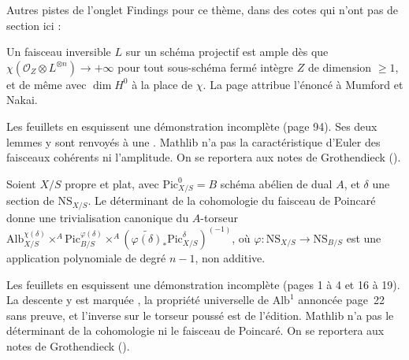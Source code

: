 \bigskip
\noindent Autres pistes de l'onglet Findings pour ce thème, dans des cotes qui n'ont pas de section ici :\par

\begin{encadre}
\begin{theoreme*}\nonverifie
Un faisceau inversible $L$ sur un schéma projectif est ample dès que $\chi(\mathcal O_Z \otimes L^{\otimes n}) \to +\infty$ pour tout sous-schéma fermé intègre $Z$ de dimension $\geq 1$, et de même avec $\dim H^0$ à la place de $\chi$. La page attribue l'énoncé à Mumford et Nakai.
\end{theoreme*}
\end{encadre}
{\small Les feuillets en esquissent une démonstration incomplète (page 94). Ses deux lemmes y sont renvoyés à une . Mathlib n'a pas la caractéristique d'Euler des faisceaux cohérents ni l'amplitude. On se reportera aux notes de Grothendieck ().\par}

\begin{encadre}
\begin{theoreme*}\nonverifie
Soient $X/S$ propre et plat, avec $\mathrm{Pic}^0_{X/S} = B$ schéma abélien de dual $A$, et $\delta$ une section de $\mathrm{NS}_{X/S}$. Le déterminant de la cohomologie du faisceau de Poincaré donne une trivialisation canonique du $A$-torseur $\mathrm{Alb}^{\chi(\delta)}_{X/S} \times^A \mathrm{Pic}^{\varphi(\delta)}_{B/S} \times^A (\widetilde{\varphi(\delta)}_*\mathrm{Pic}^\delta_{X/S})^{(-1)}$, où $\varphi : \mathrm{NS}_{X/S} \to \mathrm{NS}_{B/S}$ est une application polynomiale de degré $n - 1$, non additive.
\end{theoreme*}
\end{encadre}
{\small Les feuillets en esquissent une démonstration incomplète (pages 1 à 4 et 16 à 19). La descente y est marquée , la propriété universelle de $\mathrm{Alb}^1$ annoncée page~22 sans preuve, et l'inverse sur le torseur poussé est de l'édition. Mathlib n'a pas le déterminant de la cohomologie ni le faisceau de Poincaré. On se reportera aux notes de Grothendieck ().\par}

